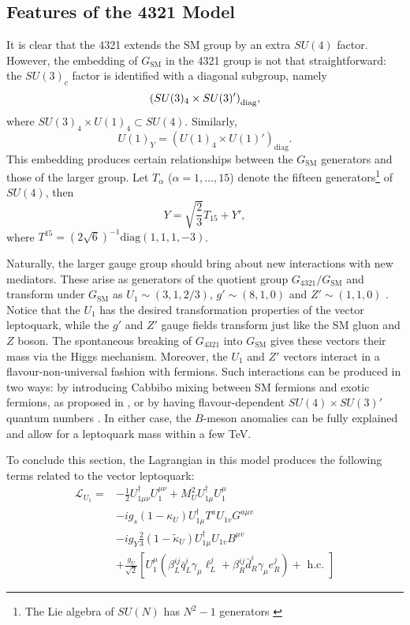 \subsection{Features of the 4321 Model}

It is clear that the 4321 extends the SM group by an extra $SU(4)$ factor. However, the embedding of $G_{\text{SM}}$ in the 4321 group is not that straightforward: the $SU(3)_c$ factor is identified with a diagonal subgroup, namely $$\qty(SU(3)_4 \times SU(3)')_{\mathrm{diag}},$$ where $SU(3)_4\times U(1)_4 \subset SU(4)$. Similarly, $$U(1)_Y = (U(1)_4\times U(1)')_{\mathrm{diag}}.$$ This embedding produces certain relationships between the $G_{\mathrm{SM}}$ generators and those of the larger group. Let $T_{\alpha}$ ($\alpha = 1,\dotsc,15$) denote the fifteen generators\footnote{The Lie algebra of $SU(N)$ has $N^2-1$ generators \cite{hall_lie_2015}} of $SU(4)$, then $$Y = \sqrt{\frac{2}{3}} T_{15} + Y',$$ where $T^{15} =  (2\sqrt{6})^{-1} \mathrm{diag}(1,1,1,-3)$.

Naturally, the larger gauge group should bring about new interactions with new mediators. These arise as generators of the quotient group $G_{4321}/G_{\mathrm{SM}}$ and transform under $G_{\mathrm{SM}}$ as $U_1\sim (3,1,2/3)$, $g'\sim (8,1,0)$ and $Z'\sim (1,1,0)$ \cite{di_luzio_maximal_2018, di_luzio_gauge_2017}. Notice that the $U_1$ has the desired transformation properties of the vector leptoquark, while the $g'$ and $Z'$ gauge fields transform just like the SM gluon and $Z$ boson. The spontaneous breaking of $G_{4321}$ into $G_{\mathrm{SM}}$ gives these vectors their mass via the Higgs mechanism. Moreover, the $U_1$ and $Z'$ vectors interact in a flavour-non-universal fashion with fermions. Such interactions can be produced in two ways: by introducing Cabbibo mixing between SM fermions and exotic fermions, as proposed in \cite{di_luzio_gauge_2017}, or by having flavour-dependent $SU(4)\times SU(3)'$ quantum numbers \cite{bordone_three-site_2018, greljo_third_2018}. In either case, the $B$-meson anomalies can be fully explained and allow for a leptoquark mass within a few TeV. 

To conclude this section, the Lagrangian in this model produces the following terms related to the vector leptoquark:
\begin{equation}\label{eq:U1-lag}
    \begin{aligned}
        \mathcal{L}_{U_{1}}=&-\frac{1}{2} U_{1 \mu \nu}^{\dagger} U_{1}^{\mu \nu}+M_{U}^{2} U_{1 \mu}^{\dagger} U_{1}^{\mu} \\
        &-i g_{s}\left(1-\kappa_{U}\right) U_{1 \mu}^{\dagger} T^{a} U_{1 v} G^{a \mu v} \\
        &-i g_{Y} \frac{2}{3}\left(1-\tilde{\kappa}_{U}\right) U_{1 \mu}^{\dagger} U_{1 v} B^{\mu v} \\
        &+\frac{g_{U}}{\sqrt{2}}\left[U_{1}^{\mu}\left(\beta_{L}^{i j} \bar{q}_{L}^{i} \gamma_{\mu} \ell_{L}^{j}+\beta_{R}^{i j} \bar{d}_{R}^{i} \gamma_{\mu} e_{R}^{j}\right)+\text { h.c. }\right]
    \end{aligned}
\end{equation}

